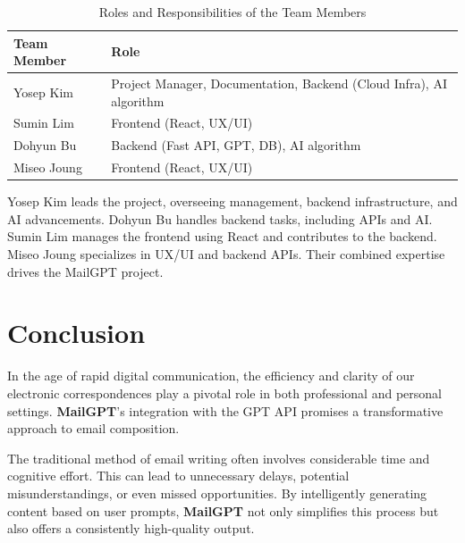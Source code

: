 \documentclass[12pt]{article}
\begin{document}
\begin{table}[ht]
	\centering
	\begin{tabularx}{\textwidth}{|X|X|}
		\hline
		\rowcolor{gray!30}
		Team Member & Role                                                                \\
		\hline
		Yosep Kim   & Project Manager, Documentation, Backend (Cloud Infra), AI algorithm \\
		\hline
		Sumin Lim   & Frontend (React, UX/UI)                                           \\
		\hline
		Dohyun Bu & Backend (Fast API, GPT, DB), AI algorithm                           \\
		\hline
		Miseo Joung & Frontend (React, UX/UI)                                           \\
		\hline
	\end{tabularx}
	\caption{Roles and Responsibilities of the Team Members}
\end{table}

Yosep Kim leads the project, overseeing management, backend infrastructure, and AI advancements. Dohyun Bu handles backend tasks, including APIs and AI. Sumin Lim manages the frontend using React and contributes to the backend. Miseo Joung specializes in UX/UI and backend APIs. Their combined expertise drives the MailGPT project.

\titleformat{\section}[block]{\normalfont\Large\bfseries\color{darkblue}}{\thesection}{1em}{}

\section*{Conclusion}

In the age of rapid digital communication, the efficiency and clarity of our electronic correspondences play a pivotal role in both professional and personal settings. \textbf{MailGPT}'s integration with the GPT API promises a transformative approach to email composition.

The traditional method of email writing often involves considerable time and cognitive effort. This can lead to unnecessary delays, potential misunderstandings, or even missed opportunities. By intelligently generating content based on user prompts, \textbf{MailGPT} not only simplifies this process but also offers a consistently high-quality output.
\end{document}
